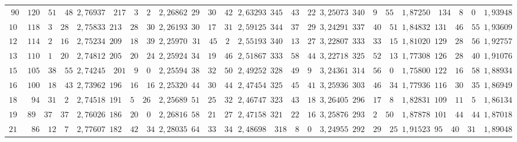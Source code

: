 \begin{landscape}
\begin{center}
\begin{tabular}{r|r|r|r|r|r|r|r|r|r|r|r|r}
\(90\) & \(120\quad 51\quad 48\) & \(2{,}76937\) & \(217\quad 3\quad 2\) & \(2{,}26862\) & \(29\quad 30\quad 42\) & \(2{,}63293\) & \(345\quad 43\quad 22\) & \(3{,}25073\) & \(340\quad 9\quad 55\) & \(1{,}87250\) & \(134\quad 8\quad 0\) & \(1{,}93948\) \\
\(105\) & \(118\quad 3\quad 28\) & \(2{,}75833\) & \(213\quad 28\quad 30\) & \(2{,}26193\) & \(30\quad 17\quad 31\) & \(2{,}59125\) & \(344\quad 37\quad 29\) & \(3{,}24291\) & \(337\quad 40\quad 51\) & \(1{,}84832\) & \(131\quad 46\quad 55\) & \(1{,}93609\) \\[3pt]
\(120\) & \(114\quad 2\quad 16\) & \(2{,}75234\) & \(209\quad 18\quad 39\) & \(2{,}25970\) & \(31\quad 45\quad 2\) & \(2{,}55193\) & \(340\quad 13\quad 27\) & \(3{,}22807\) & \(333\quad 33\quad 15\) & \(1{,}81020\) & \(129\quad 28\quad 56\) & \(1{,}92757\) \\
\(135\) & \(110\quad 1\quad 20\) & \(2{,}74812\) & \(205\quad 20\quad 24\) & \(2{,}25924\) & \(34\quad 19\quad 46\) & \(2{,}51867\) & \(333\quad 58\quad 44\) & \(3{,}22718\) & \(325\quad 52\quad 13\) & \(1{,}77308\) & \(126\quad 28\quad 40\) & \(1{,}91076\) \\
\(150\) & \(105\quad 38\quad 55\) & \(2{,}74245\) & \(201\quad 9\quad 0\) & \(2{,}25594\) & \(38\quad 32\quad 50\) & \(2{,}49252\) & \(328\quad 49\quad 9\) & \(3{,}24361\) & \(314\quad 56\quad 0\) & \(1{,}75800\) & \(122\quad 16\quad 58\) & \(1{,}88934\) \\
\(165\) & \(100\quad 18\quad 43\) & \(2{,}73962\) & \(196\quad 16\quad 16\) & \(2{,}25320\) & \(44\quad 30\quad 44\) & \(2{,}47454\) & \(325\quad 45\quad 41\) & \(3{,}25936\) & \(303\quad 46\quad 34\) & \(1{,}77936\) & \(116\quad 30\quad 35\) & \(1{,}86949\) \\[3pt]
\(180\) & \(94\quad 31\quad 2\) & \(2{,}74518\) & \(191\quad 5\quad 26\) & \(2{,}25689\) & \(51\quad 25\quad 32\) & \(2{,}46747\) & \(323\quad 43\quad 18\) & \(3{,}26405\) & \(296\quad 17\quad 8\) & \(1{,}82831\) & \(109\quad 11\quad 5\) & \(1{,}86134\) \\
\(195\) & \(89\quad 37\quad 37\) & \(2{,}76026\) & \(186\quad 20\quad 0\) & \(2{,}26816\) & \(58\quad 21\quad 27\) & \(2{,}47158\) & \(321\quad 22\quad 16\) & \(3{,}25876\) & \(293\quad 2\quad 50\) & \(1{,}87878\) & \(101\quad 44\quad 44\) & \(1{,}87018\) \\
\(210\) & \(86\quad 12\quad 7\) & \(2{,}77607\) & \(182\quad 42\quad 34\) & \(2{,}28035\) & \(64\quad 33\quad 34\) & \(2{,}48698\) & \(318\quad 8\quad 0\) & \(3{,}24955\) & \(292\quad 29\quad 25\) & \(1{,}91523\) & \(95\quad 40\quad 31\) & \(1{,}89048\) \\

\end{tabular}
\end{center}
\end{landscape}
